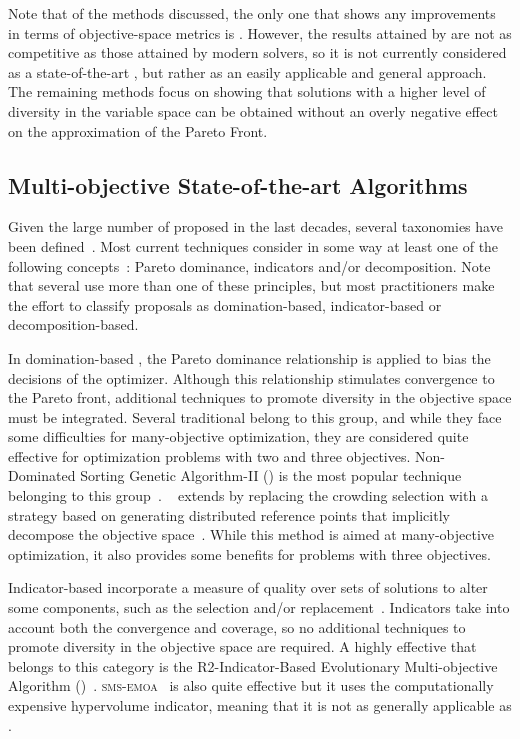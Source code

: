 Note that of the methods discussed, the only one that shows any improvements in terms of objective-space metrics is \GDEA{}.
%
However, the results attained by \GDEA{} are not as competitive as those attained by modern solvers, so it is not currently
considered as a state-of-the-art \MOEA{}, but rather as an easily applicable and general approach.
%
The remaining methods focus on showing that solutions with a higher level of diversity in the variable space
can be obtained without an overly negative effect
on the approximation of the Pareto Front.


\subsection{Multi-objective State-of-the-art Algorithms}

Given the large number of \MOEAS{} proposed in the last decades, several taxonomies have been defined~\cite{bechikh2016recent}.
%
Most current techniques consider in some way at least one of the following concepts~\cite{trivedi2016survey}:
Pareto dominance, indicators and/or decomposition.
%
Note that several \MOEAS{} use more than one of these principles, but most practitioners make the effort to classify
proposals as domination-based, indicator-based or decomposition-based.

In domination-based \MOEAS{}, the Pareto dominance relationship is applied to bias the decisions of the optimizer.
%
Although this relationship stimulates convergence to the Pareto front, additional techniques to promote
diversity in the objective space must be integrated.
%
Several traditional \MOEAS{} belong to this group, and while they face some difficulties for many-objective
optimization, they are considered quite effective for optimization problems with two and three objectives.
%
Non-Dominated Sorting Genetic Algorithm-II (\NSGAII{}) is the most popular technique belonging to this group~\cite{deb2002fast}.
%
\NSGAIII{}~\cite{deb2013evolutionary} extends \NSGAII{} by replacing the crowding selection with a strategy 
based on generating distributed reference points that implicitly decompose the objective space~\cite{trivedi2016survey}.
%
While this method is aimed at many-objective optimization, it also provides some benefits for problems with three objectives.

Indicator-based \MOEAS{} incorporate a measure of quality over sets of solutions to alter some components, such as the 
selection and/or replacement~\cite{zitzler2004indicator}.
%
Indicators take into account both the convergence and coverage, so no additional techniques to promote diversity
in the objective space are required.
%
A highly effective \MOEA{} that belongs to this category is the R2-Indicator-Based Evolutionary Multi-objective 
Algorithm (\RMOEA{})~\cite{trautmann2013r2}.
%
\textsc{sms-emoa}~\cite{beume:07} is also quite effective 
but it uses the computationally expensive hypervolume indicator, meaning that it is not as generally applicable as \RMOEA{}.

